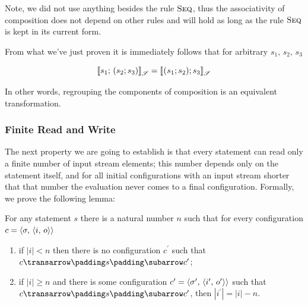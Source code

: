 Note, we did not use anything besides the rule $\textsc{Seq}$, thus
the associativity of composition does not depend on other rules and will hold as long as the rule $\textsc{Seq}$
is kept in its current form.

From what we've just proven it is immediately follows that for arbitrary $s_1,\,s_2,\,s_3$ 

\[
\sembr{\llang{$s_1$; ($s_2$; $\,s_3$)}}^\ph_\mathscr{S}=\sembr{\llang{($s_1$; $\,s_2$); $\,s_3$}}^\ph_\mathscr{S}
\]

In other words, regrouping the components of composition is an equivalent transformation.

\subsubsection{Finite Read and Write}

The next property we are going to establish is that every statement can read only a finite number of input
stream elements; this number depends only on the statement itself, and for all initial configurations with an input stream
shorter that that number the evaluation never comes to a final configuration. Formally, we prove the following lemma:

\begin{lemma} For any statement $s$ there is a natural number $n$ such that for every configuration $c=\left<{\sigma,\,\left<{i,\,o}\right>}\right>$

\begin{enumerate}
\item if $|i|<n$ then there is no configuration $c^\prime$ such that $\trans{c}{s}{c^\prime}$;
\item if $|i|\ge n$ and there is some configuration $c^\prime=\left<{\sigma^\prime,\,\left<{i^\prime,\,o^\prime}\right>}\right>$ such that $\trans{c}{s}{c^\prime}$, then
  $|i^\prime|=|i|-n$.
\end{enumerate}

\end{lemma}

